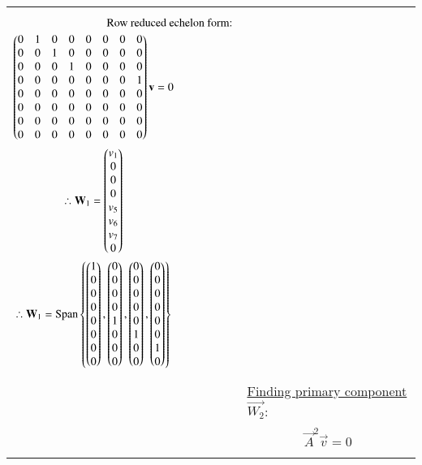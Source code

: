\begin{longtable}{|p{4cm}|p{14cm}|}
\begin{gather}
\intertext{$\qquad \qquad \qquad \qquad $ Row reduced echelon form:}
\begin{pmatrix}0& 1& 0& 0& 0& 0& 0& 0\\
0& 0& 1& 0& 0& 0& 0& 0\\
0& 0& 0& 1& 0& 0& 0& 0\\
0& 0& 0& 0& 0& 0& 0& 1\\
0& 0& 0& 0& 0& 0& 0& 0\\
0& 0& 0& 0& 0& 0& 0& 0\\
0& 0& 0& 0& 0& 0& 0& 0\\
0& 0& 0& 0& 0& 0& 0& 0
\end{pmatrix}\mathbf{v}=0 \\
\therefore \mathbf{W}_1=\begin{pmatrix}v_1\\0\\0\\0\\v_5\\v_6\\v_7\\0\end{pmatrix}\\
\therefore \mathbf{W}_1= \text{Span} \left \{ \begin{pmatrix}1\\0\\0\\0\\0\\0\\0\\0\end{pmatrix},\begin{pmatrix}0\\0\\0\\0\\1\\0\\0\\0\end{pmatrix},\begin{pmatrix}0\\0\\0\\0\\0\\1\\0\\0\end{pmatrix},\begin{pmatrix}0\\0\\0\\0\\0\\0\\1\\0\end{pmatrix} \right \} \label{eq:solutions/7/4/5/eq5}
		\end{gather}\\
		&\underline{Finding primary component $\vec{W_2}$}: \\
		&\begin{gather}
		    \vec{A}^2\vec{v}=0\\

\end{gather}
\end{longtable}
